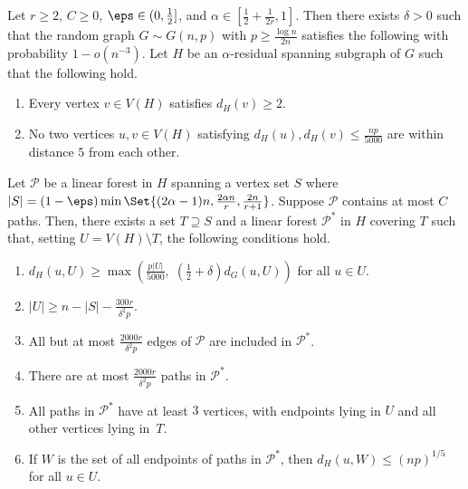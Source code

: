 \documentclass[10pt,a4paper,reqno]{amsart}
\begin{document}
\begin{theorem} \label{thm:clean-up_main}
    Let $r\ge 2$, $C\ge 0$, $\eps \in (0,\frac{1}{2}]$, and $\alpha \in \left[\frac{1}{2} + \frac{1}{2r}, 1\right]$.
    Then there exists $\delta >0$ such that the random graph $G \sim G(n,p)$ with $p \ge \frac{\log{n}}{2n}$ satisfies the following with probability $1-o(n^{-3})$.
    Let $H$ be an $\alpha$-residual spanning subgraph of $G$ such that the following hold. 
    \begin{enumerate}[leftmargin=*,label = {\bfseries A\arabic{enumi}}]
    \item Every vertex $v\in V(H)$ satisfies $d_H(v)\ge 2$.
    \label{item:mindeg2}
    \item No two vertices $u,v\in V(H)$ satisfying $d_H(u),d_H(v)\le \frac{np}{5000}$ are within distance $5$ from each other.
    \label{item:property low_deg_vertices_far_apart}
    \end{enumerate}
    Let $\mathcal{P}$ be a linear forest in $H$ spanning a vertex set $S$ where ${|S| = (1-\eps) \min\Set{(2\alpha - 1)n, \frac{2\alpha n}{r}, \frac{2n}{r+1}}}$. Suppose $\mathcal{P}$ contains at most $C$ paths.
    Then, there exists a set $T \supseteq S$ and a linear forest $\mathcal{P}^*$ in $H$ covering $T$ such that, setting $U = V(H)\setminus T$, the following conditions hold.
    
    \begin{enumerate}[leftmargin=*,label = {\bfseries B\arabic{enumi}}]
    \item $d_{H}\left(u,U\right) \ge \max\left(\frac{p|U|}{5000}, \; \left(\frac{1}{2}+\delta\right)d_{G}\left(u,U\right)\right)$ for all $u \in U$.
    \label{eq:degree_in_U}
    \item $|U| \ge n - |S| - \frac{300r}{\delta^2 p}$.
    \label{eq:size_of_U}    
    \item All but at most $\frac{2000r}{\delta^2 p}$ edges of $\mathcal{P}$ are included in $\mathcal{P}^*$.\label{eq:most_of_path_used}
    \item There are at most $\frac{2000r}{\delta^2 p}$ paths in $\mathcal{P}^*$.
    \label{eq:number_of_paths}
    \item All paths in $\mathcal{P}^*$ have at least $3$ vertices, with endpoints lying in $U$ and all other vertices lying in~$T$. \label{eq:matching}
    \item If $W$ is the set of all endpoints of paths in $\mathcal{P}^*$, then $d_H(u, W) \le (np)^{1/5}$ for all $u \in U$.
    \label{eq:deg_U_to_M}
    \end{enumerate}
\end{theorem}
\end{document}
